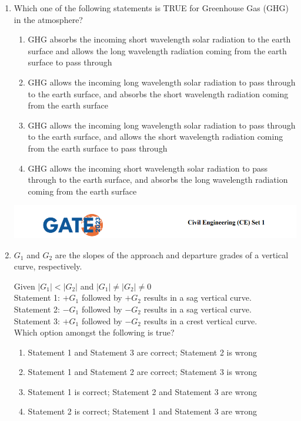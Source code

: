 \documentclass{exam}
\begin{document}
\begin{enumerate}
\item Which one of the following statements is TRUE for Greenhouse Gas (GHG) in the atmosphere?
\begin{enumerate}
    \item GHG absorbs the incoming short wavelength solar radiation to the earth surface and allows the long wavelength radiation coming from the earth surface to pass through
    \item GHG allows the incoming long wavelength solar radiation to pass through to the earth surface, and absorbs the short wavelength radiation coming from the earth surface
    \item GHG allows the incoming long wavelength solar radiation to pass through to the earth surface, and allows the short wavelength radiation coming from the earth surface to pass through
    \item GHG allows the incoming short wavelength solar radiation to pass through to the earth surface, and absorbs the long wavelength radiation coming from the earth surface
\end{enumerate}
\vspace{0.5cm}

\newpage

\includegraphics[width=\textwidth]{pics/header.png}
\item $G_1$ and $G_2$ are the slopes of the approach and departure grades of a vertical curve, respectively.

\noindent
Given $|G_1| < |G_2|$ and $|G_1| \neq |G_2| \neq 0$\\
Statement 1: $+G_1$ followed by $+G_2$ results in a sag vertical curve.\\
Statement 2: $-G_1$ followed by $-G_2$ results in a sag vertical curve.\\
Statement 3: $+G_1$ followed by $-G_2$ results in a crest vertical curve.\\

\noindent
Which option amongst the following is true?

\begin{enumerate}
    \item Statement 1 and Statement 3 are correct; Statement 2 is wrong
    \item Statement 1 and Statement 2 are correct; Statement 3 is wrong
    \item Statement 1 is correct; Statement 2 and Statement 3 are wrong
    \item Statement 2 is correct; Statement 1 and Statement 3 are wrong
\end{enumerate}
\vspace{0.5cm}


\end{enumerate}
\end{document}
